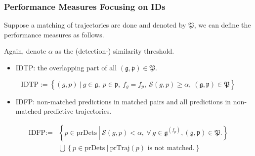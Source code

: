 \documentclass[slidetop, mathserif, dvipsnames]{beamer}
\begin{document}
\begin{frame}
	\frametitle{Performance Measures Focusing on IDs}
			
	Suppose a matching of trajectories are done and denoted by $\mathfrak P$,
	we can define the performance measures as follows.
			
	\vspace{4pt}
			
	Again, denote $\alpha$ as the (detection-) similarity threshold.
	\begin{itemize}
		\item IDTP:
		      the overlapping part of all $(\mathfrak g, \mathfrak p) \in \mathfrak P$.
	\end{itemize}
			
	\vspace{-15pt}
	\[
		\text{IDTP} := \left\{ (g,p)\ |\ 
		g\in\mathfrak g, ~ p\in\mathfrak p, ~
		f_g=f_p, ~ 
		\mathcal S(g,p) \geq \alpha, ~ 
		(\mathfrak g, \mathfrak p)\in\mathfrak P
		\right\}
	\]
	\vspace{-10pt}
	\begin{itemize}
		\item IDFP:
		      non-matched predictions in matched pairs
		      and all predictions in non-matched predictive trajectories.
	\end{itemize}
	\begin{align*}
	\text{IDFP} := & \left\{ p\in\text{prDets}\ \left|\                                                
	\mathcal S(g,p)<\alpha, \ 
	\forall\ g\in\mathfrak g^{(f_p)},
	(\mathfrak g,\mathfrak p)\in\mathfrak P.
	\right.
	\right\} \\
					& \bigcup \left\{p \in \text{prDets}\ |\ \text{prTraj$(p)$ is not matched.}\right\} 
	\end{align*}
			    
\end{frame}
\end{document}
